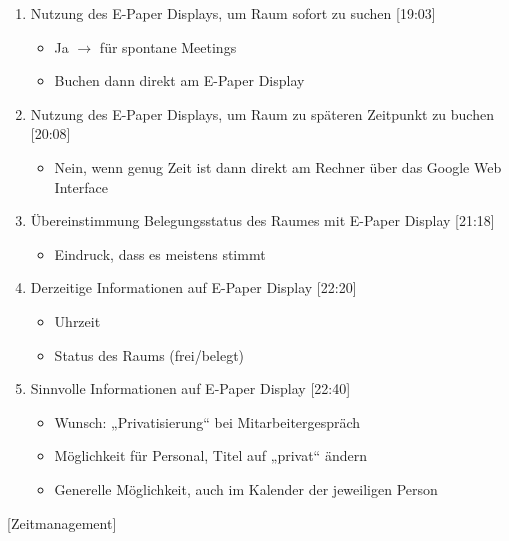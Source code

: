 \begin{enumerate}

    \item Nutzung des E-Paper Displays, um Raum sofort zu suchen [19:03]
     \begin{itemize}
        \item Ja $\rightarrow$ für spontane Meetings 
        \item Buchen dann direkt am E-Paper Display
    \end{itemize}

    \item Nutzung des E-Paper Displays, um Raum zu späteren Zeitpunkt zu buchen [20:08]
     \begin{itemize}
        \item Nein, wenn genug Zeit ist dann direkt am Rechner über das Google Web Interface
    \end{itemize}

    \item Übereinstimmung Belegungsstatus des Raumes mit E-Paper Display [21:18] 
     \begin{itemize}
        \item Eindruck, dass es meistens stimmt
    \end{itemize}

    \item Derzeitige Informationen auf E-Paper Display [22:20]
     \begin{itemize}
        \item Uhrzeit
        \item Status des Raums (frei/belegt)
    \end{itemize}

    \item Sinnvolle Informationen auf E-Paper Display [22:40]
     \begin{itemize}
        \item Wunsch: „Privatisierung“ bei Mitarbeitergespräch
        \item Möglichkeit für Personal, Titel auf „privat“ ändern
        \item Generelle Möglichkeit, auch im Kalender der jeweiligen Person 
    \end{itemize}
    
\end{enumerate}

[Zeitmanagement]

